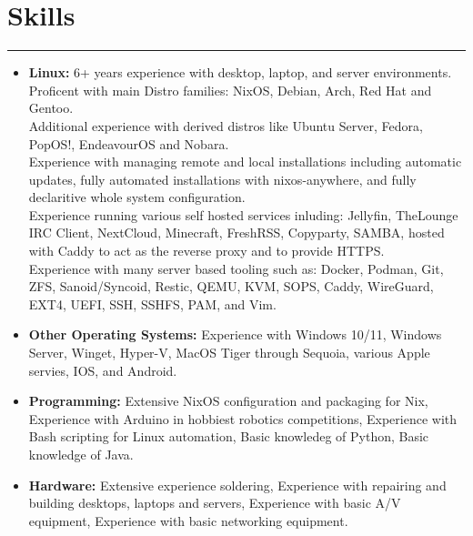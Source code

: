 \documentclass[a4paper,11pt]{article}
\begin{document}
\section*{\hspace*{1em} Skills}
\vspace{-0.2cm}
\hrule
\vspace{0.3cm}
\begin{itemize}
    \item \textbf{Linux:} 6+ years experience with desktop, laptop, and server environments. \\
    Proficent with main Distro families: NixOS, Debian, Arch, Red Hat and Gentoo. \\
    Additional experience with derived distros like Ubuntu Server, Fedora, PopOS!, EndeavourOS and Nobara. \\ 
    Experience with managing remote and local installations including automatic updates, fully automated installations with nixos-anywhere, and fully declaritive whole system configuration. \\
    Experience running various self hosted services inluding: Jellyfin, TheLounge IRC Client, NextCloud, Minecraft, FreshRSS, Copyparty, SAMBA, hosted with Caddy to act as the reverse proxy and to provide HTTPS. \\
    Experience with many server based tooling such as: Docker, Podman, Git, ZFS, Sanoid/Syncoid, Restic, QEMU, KVM, SOPS, Caddy, WireGuard, EXT4, UEFI, SSH, SSHFS, PAM, and Vim. \\
    \vspace{-0.7cm}
    \item \textbf{Other Operating Systems:} Experience with Windows 10/11, Windows Server, Winget, Hyper-V, MacOS Tiger through Sequoia, various Apple servies, IOS, and Android. \\
    \vspace{-0.7cm}
    \item \textbf{Programming:} Extensive NixOS configuration and packaging for Nix, Experience with Arduino in hobbiest robotics competitions, Experience with Bash scripting for Linux automation, Basic knowledeg of Python, Basic knowledge of Java. \\
    \vspace{-0.7cm}
    \item \textbf{Hardware:} Extensive experience soldering, Experience with repairing and building desktops, laptops and servers, Experience with basic A/V equipment, Experience with basic networking equipment. \\
\end{itemize} 
\end{document}
